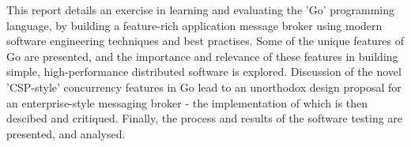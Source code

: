 This report details an exercise in learning and evaluating the 'Go' programming
language, by building a feature-rich application message broker using modern
software engineering techniques and best practises. Some of the unique features
of Go are presented, and the importance and relevance of these features in
building simple, high-performance distributed software is explored. Discussion
of the novel 'CSP-style' concurrency features in Go lead to an unorthodox design
proposal for an enterprise-style messaging broker - the implementation of which
is then descibed and critiqued. Finally, the process and results of the software
testing are presented, and analysed.
